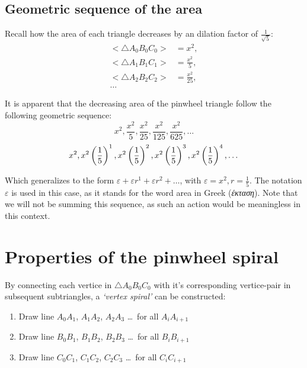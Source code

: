\subsection{Geometric sequence of the area}
Recall how the area of each triangle decreases by an dilation factor of $\frac{1}{\sqrt{5}}$:
\begin{equation}
    \begin{aligned}
        \big<\triangle A_{0}B_{0}C_{0}\big> &= x^2,\\
        \big<\triangle A_{1}B_{1}C_{1}\big> &= \frac{x^2}{5},\\
        \big<\triangle A_{2}B_{2}C_{2}\big> &= \frac{x^2}{25},\\
        \ldots
    \end{aligned}
\end{equation}

\noindent
It is apparent that the decreasing area of the pinwheel triangle follow the following geometric sequence:
\begin{equation}
    x^2, \frac{x^2}{5}, \frac{x^2}{25}, \frac{x^2}{125}, \frac{x^2}{625}, \ldots
\end{equation}
\begin{equation}
    x^2, x^2\left(\frac{1}{5}\right)^1, x^2\left(\frac{1}{5}\right)^2, x^2\left(\frac{1}{5}\right)^3, x^2\left(\frac{1}{5}\right)^4, \ldots \\
\end{equation}

\noindent
Which generalizes to the form $\varepsilon + \varepsilon r^1 + \varepsilon r^2 + \ldots$, with $\varepsilon = x^2, r = \frac{1}{5}$. The notation $\varepsilon$ is used in this case, as it stands for the word area in Greek (\emph{έκταση}). Note that we will not be summing this sequence, as such an action would be meaningless in this context.

\newpage
\section{Properties of the pinwheel spiral}
By connecting each vertice in $\triangle A_{0}B_{0}C_{0}$ with it's corresponding vertice-pair in subsequent subtriangles, a \emph{`vertex spiral'} can be constructed:

\begin{enumerate}
    \item Draw line $A_{0}A_{1}$, $A_{1}A_{2}$, $A_{2}A_{3}$ \ldots\ for all $A_{i}A_{i + 1}$
    \item Draw line $B_{0}B_{1}$, $B_{1}B_{2}$, $B_{2}B_{3}$ \ldots\ for all $B_{i}B_{i + 1}$
    \item Draw line $C_{0}C_{1}$, $C_{1}C_{2}$, $C_{2}C_{3}$ \ldots\ for all $C_{i}C_{i + 1}$
\end{enumerate}

